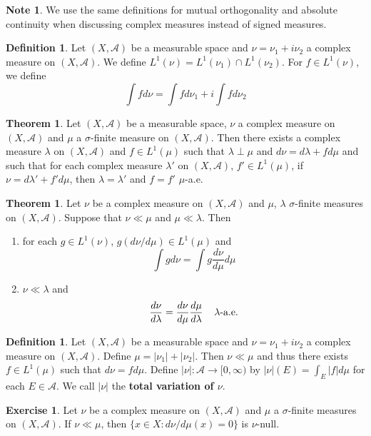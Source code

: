 \documentclass[12pt]{amsart}
\theoremstyle{definition}
\newtheorem{defn}[definition]{Definition}
\newtheorem{note}[definition]{Note}
\newtheorem{thm}[definition]{Theorem}
\newtheorem{ex}[definition]{Exercise}
\newcommand{\lam}{\lambda}
\newcommand{\sig}{\sigma}
\newcommand{\MA}{\mathcal{A}}
\newcommand{\Rg}{[0,\infty)}
\newcommand{\lex}[1]{\label{ex:#1}}
\newcommand{\ld}[1]{\label{defn:#1}}
\begin{document}
	\begin{note}
		We use the same definitions for mutual orthogonality and absolute continuity when discussing complex measures instead of signed measures.
	\end{note}
	
	\begin{defn} \ld{00000} 
		Let $(X,\MA)$ be a measurable space and $\nu = \nu_1 + i\nu_2$ a complex measure on $(X,\MA)$. We define $L^1(\nu) = L^1(\nu_1)\cap L^1(\nu_2)$. For $f \in L^1(\nu)$, we define $$\int f d\nu = \int fd\nu_1 + i \int f d \nu_2$$
	\end{defn}
	
	\begin{thm}
		Let $(X,\MA)$ be a measurable space, $\nu$ a complex measure on $(X, \MA)$ and $\mu$ a $\sig$-finite measure on $(X, \MA)$. Then there exists a  complex measure $\lambda$ on $(X, \MA)$ and $f \in L^1(\mu)$ such that $\lam \perp \mu$ and $d \nu = d \lam + f d\mu$ and such that for each complex measure $\lam '$ on $(X, \MA)$, $f' \in L^1(\mu)$, if $\nu = d \lam '+ f'd \mu$, then $\lam = \lam '$ and $f = f'$  $\mu$-a.e.
	\end{thm}
	
	\begin{thm}
		Let $\nu$ be a complex measure on $(X, \MA)$ and $\mu$, $\lam$ $\sig$-finite measures on $(X,\MA)$. Suppose that $\nu \ll \mu$ and $\mu \ll \lam$. Then 
		\begin{enumerate}
			\item for each $g \in L^1(\nu)$, $g(d\nu/d\mu) \in  L^1(\mu)$ and $$\int g d\nu = \int g \frac{d\nu}{d\mu} d\mu$$
			\item $\nu \ll \lam$ and $$\frac{d \nu}{d\lam} = \frac{d \nu}{d\mu} \frac{d\mu}{d\lam} \hspace{4mm} \lam \text{-a.e.}$$
		\end{enumerate}
	\end{thm}
	
	\begin{defn} \ld{00000} Let $(X,\MA)$ be a measurable space and $\nu = \nu_1 + i \nu_2$ a complex measure on $(X, \MA)$. Define $\mu = |\nu_1| + |\nu_2|$. Then $\nu \ll \mu$ and thus there exists $f \in L^1(\mu)$ such that $d\nu = f d\mu$. Define $|\nu|: \MA \rightarrow \Rg$ by $|\nu|(E) = \int_E |f|d\mu$ for each $E \in \MA$. We call $|\nu|$ the \textbf{total variation of $\nu$}. 
	\end{defn}
	
	\begin{ex} \lex{00000} 
		Let $\nu$ be a complex measure on $(X, \MA)$ and $\mu$ a $\sig$-finite measures on $(X,\MA)$. If $\nu \ll \mu$, then $\{x \in X: d\nu / d \mu(x) = 0 \}$ is $\nu$-null.
	\end{ex}
	
\end{document}
